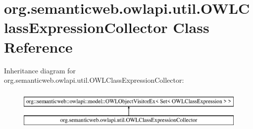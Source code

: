 \hypertarget{classorg_1_1semanticweb_1_1owlapi_1_1util_1_1_o_w_l_class_expression_collector}{\section{org.\-semanticweb.\-owlapi.\-util.\-O\-W\-L\-Class\-Expression\-Collector Class Reference}
\label{classorg_1_1semanticweb_1_1owlapi_1_1util_1_1_o_w_l_class_expression_collector}
}
Inheritance diagram for org.\-semanticweb.\-owlapi.\-util.\-O\-W\-L\-Class\-Expression\-Collector\-:\begin{figure}[H]
\begin{center}
\leavevmode
\includegraphics[height=2.000000cm]{classorg_1_1semanticweb_1_1owlapi_1_1util_1_1_o_w_l_class_expression_collector}
\end{center}
\end{figure}
